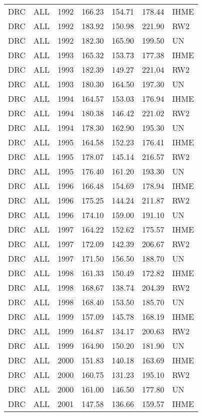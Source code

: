 \begin{longtable}{lllrrrl}
  DRC & ALL & 1992 & 166.23 & 154.71 & 178.44 & IHME \\ 
  DRC & ALL & 1992 & 183.92 & 150.98 & 221.90 & RW2 \\ 
  DRC & ALL & 1992 & 182.30 & 165.90 & 199.50 & UN \\ 
  DRC & ALL & 1993 & 165.32 & 153.73 & 177.38 & IHME \\ 
  DRC & ALL & 1993 & 182.39 & 149.27 & 221.04 & RW2 \\ 
  DRC & ALL & 1993 & 180.30 & 164.50 & 197.30 & UN \\ 
  DRC & ALL & 1994 & 164.57 & 153.03 & 176.94 & IHME \\ 
  DRC & ALL & 1994 & 180.38 & 146.42 & 221.02 & RW2 \\ 
  DRC & ALL & 1994 & 178.30 & 162.90 & 195.30 & UN \\ 
  DRC & ALL & 1995 & 164.58 & 152.23 & 176.41 & IHME \\ 
  DRC & ALL & 1995 & 178.07 & 145.14 & 216.57 & RW2 \\ 
  DRC & ALL & 1995 & 176.40 & 161.20 & 193.30 & UN \\ 
  DRC & ALL & 1996 & 166.48 & 154.69 & 178.94 & IHME \\ 
  DRC & ALL & 1996 & 175.25 & 144.24 & 211.87 & RW2 \\ 
  DRC & ALL & 1996 & 174.10 & 159.00 & 191.10 & UN \\ 
  DRC & ALL & 1997 & 164.22 & 152.62 & 175.57 & IHME \\ 
  DRC & ALL & 1997 & 172.09 & 142.39 & 206.67 & RW2 \\ 
  DRC & ALL & 1997 & 171.50 & 156.50 & 188.70 & UN \\ 
  DRC & ALL & 1998 & 161.33 & 150.49 & 172.82 & IHME \\ 
  DRC & ALL & 1998 & 168.67 & 138.74 & 204.39 & RW2 \\ 
  DRC & ALL & 1998 & 168.40 & 153.50 & 185.70 & UN \\ 
  DRC & ALL & 1999 & 157.09 & 145.78 & 168.19 & IHME \\ 
  DRC & ALL & 1999 & 164.87 & 134.17 & 200.63 & RW2 \\ 
  DRC & ALL & 1999 & 164.90 & 150.20 & 181.90 & UN \\ 
  DRC & ALL & 2000 & 151.83 & 140.18 & 163.69 & IHME \\ 
  DRC & ALL & 2000 & 160.75 & 131.23 & 195.10 & RW2 \\ 
  DRC & ALL & 2000 & 161.00 & 146.50 & 177.80 & UN \\ 
  DRC & ALL & 2001 & 147.58 & 136.66 & 159.57 & IHME \\ 

\end{longtable}
